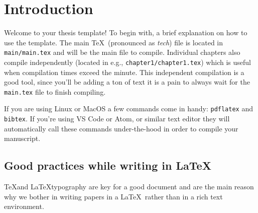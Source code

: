 
\chapter{Introduction}

Welcome to your thesis template! To begin with, a brief explanation on how to use the template. The main \TeX\ (pronounced as \textit{tech}) file is located in \texttt{main/main.tex} and will be the main file to compile. Individual chapters also compile independently (located in e.g., \texttt{chapter1/chapter1.tex}) which is useful when compilation times exceed the minute. This independent compilation is a good tool, since you'll be adding a ton of text it is a pain to always wait for the \texttt{main.tex} file to finish compiling.

If you are using Linux or MacOS a few commands come in handy: \texttt{pdflatex} and \texttt{bibtex}. If you're using VS Code or Atom, or similar text editor they will automatically call these commands under-the-hood in order to compile your manuscript.

\section{Good practices while writing in \LaTeX}

\TeX and \LaTeX typography are key for a good document and are the main reason why we bother in writing papers in a \LaTeX\ rather than in a rich text environment.

